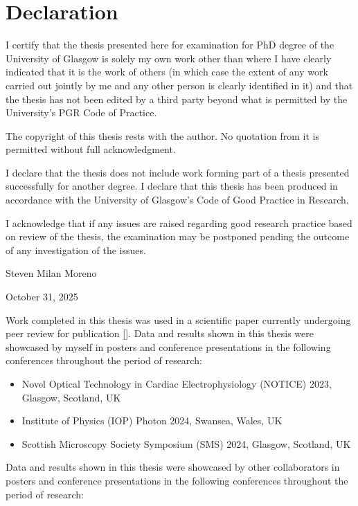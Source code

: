 \chapter{Declaration}

I certify that the thesis presented here for examination for PhD degree of the University of Glasgow is solely my own work other than where I have clearly indicated that it is the work of others (in which case the extent of any work carried out jointly by me and any other person is clearly identified in it) and that the thesis has not been edited by a third party beyond what is permitted by the University's PGR Code of Practice.

\medskip
The copyright of this thesis rests with the author. No quotation from it is permitted without full acknowledgment.

\medskip
I declare that the thesis does not include work forming part of a thesis presented successfully for another degree. I declare that this thesis has been produced in accordance with the University of Glasgow's Code of Good Practice in Research.

\medskip
I acknowledge that if any issues are raised regarding good research practice based on review of the thesis, the examination may be postponed pending the outcome of any investigation of the issues. 

\medskip
\medskip
\medskip
Steven Milan Moreno

October 31, 2025

\pagebreak
Work completed in this thesis was used in a scientific paper currently undergoing peer review for publication []. 
Data and results shown in this thesis were showcased by myself in posters and conference presentations in the following conferences throughout the period of research:
\begin{itemize}
    \item Novel Optical Technology in Cardiac Electrophysiology (NOTICE) 2023, Glasgow, Scotland, UK 
    \item Institute of Physics (IOP) Photon 2024, Swansea, Wales, UK
    \item Scottish Microscopy Society Symposium (SMS) 2024, Glasgow, Scotland, UK
    
\end{itemize}

Data and results shown in this thesis were showcased by other collaborators in posters and conference presentations in the following conferences throughout the period of research:

